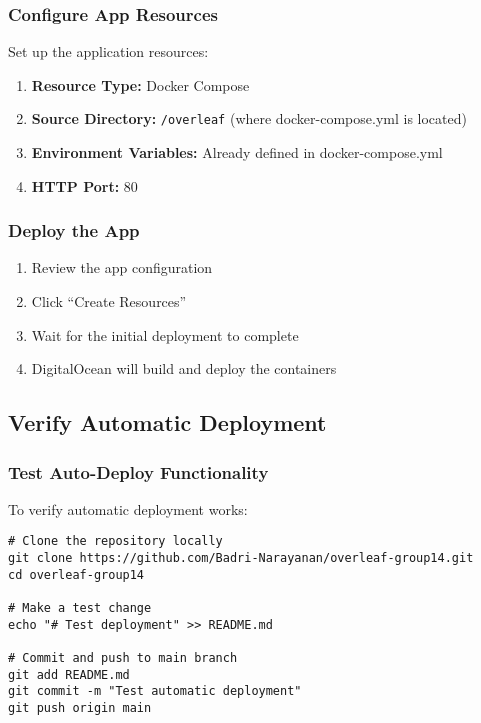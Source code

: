 \subsubsection{Configure App Resources}

Set up the application resources:

\begin{enumerate}
    \item \textbf{Resource Type:} Docker Compose
    \item \textbf{Source Directory:} \texttt{/overleaf} (where docker-compose.yml is located)
    \item \textbf{Environment Variables:} Already defined in docker-compose.yml
    \item \textbf{HTTP Port:} 80
\end{enumerate}

\subsubsection{Deploy the App}

\begin{enumerate}
    \item Review the app configuration
    \item Click ``Create Resources''
    \item Wait for the initial deployment to complete
    \item DigitalOcean will build and deploy the containers
\end{enumerate}

\subsection{Verify Automatic Deployment}

\subsubsection{Test Auto-Deploy Functionality}

To verify automatic deployment works:

\begin{verbatim}
# Clone the repository locally
git clone https://github.com/Badri-Narayanan/overleaf-group14.git
cd overleaf-group14

# Make a test change
echo "# Test deployment" >> README.md

# Commit and push to main branch
git add README.md
git commit -m "Test automatic deployment"
git push origin main
\end{verbatim}

